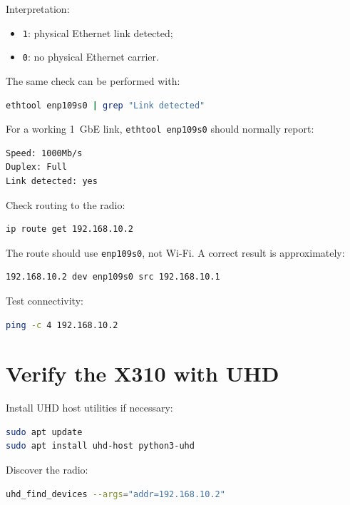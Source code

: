 \documentclass[11pt,a4paper]{article}
\begin{document}
Interpretation:

\begin{itemize}[leftmargin=*]
    \item \texttt{1}: physical Ethernet link detected;
    \item \texttt{0}: no physical Ethernet carrier.
\end{itemize}

The same check can be performed with:

\begin{lstlisting}[language=bash]
ethtool enp109s0 | grep "Link detected"
\end{lstlisting}

For a working 1~GbE link, \texttt{ethtool enp109s0} should normally report:

\begin{lstlisting}
Speed: 1000Mb/s
Duplex: Full
Link detected: yes
\end{lstlisting}

Check routing to the radio:

\begin{lstlisting}[language=bash]
ip route get 192.168.10.2
\end{lstlisting}

The route should use \texttt{enp109s0}, not Wi-Fi. A correct result is approximately:

\begin{lstlisting}
192.168.10.2 dev enp109s0 src 192.168.10.1
\end{lstlisting}

Test connectivity:

\begin{lstlisting}[language=bash]
ping -c 4 192.168.10.2
\end{lstlisting}

\section{Verify the X310 with UHD}

Install UHD host utilities if necessary:

\begin{lstlisting}[language=bash]
sudo apt update
sudo apt install uhd-host python3-uhd
\end{lstlisting}

Discover the radio:

\begin{lstlisting}[language=bash]
uhd_find_devices --args="addr=192.168.10.2"
\end{lstlisting}
\end{document}
